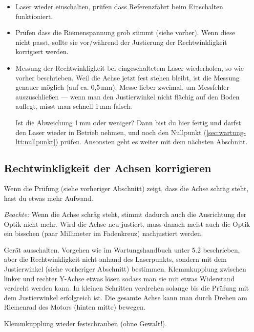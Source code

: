 \documentclass{\basedir/fablab-document}
\begin{document}
\begin{itemize}
		\item Laser wieder einschalten, prüfen dass Referenzfahrt beim Einschalten funktioniert.

		\item Prüfen dass die Riemenspannung grob stimmt (siehe vorher). Wenn diese nicht passt, sollte sie vor/während der Justierung der Rechtwinkligkeit korrigiert werden.

		\item Messung der Rechtwinkligkeit bei eingeschaltetem Laser wiederholen, so wie vorher beschrieben. Weil die Achse jetzt fest stehen bleibt, ist die Messung genauer möglich (auf ca. 0,5\,mm). Messe lieber zweimal, um Messfehler auszuschließen --- wenn man den Justierwinkel nicht flächig auf den Boden auflegt, misst man schnell 1\,mm falsch.

		Ist die Abweichung 1\,mm oder weniger? Dann bist du hier fertig und darfst den Laser wieder in Betrieb nehmen, und noch den Nullpunkt (\cref{sec:wartung-ltt:nullpunkt}) prüfen. Ansonsten geht es weiter mit dem nächsten Abschnitt.
	\end{itemize}
\subsection{Rechtwinkligkeit der Achsen korrigieren}
	Wenn die Prüfung (siehe vorheriger Abschnitt) zeigt, dass die Achse schräg steht, hast du etwas mehr Aufwand.

	\emph{Beachte:} Wenn die Achse schräg steht, stimmt dadurch auch die Ausrichtung der Optik nicht mehr. Wird die Achse neu justiert, muss danach meist auch die Optik ein bisschen (paar Millimeter im Fadenkreuz) nachjustiert werden.

	Gerät ausschalten. Vorgehen wie im Wartungshandbuch unter 5.2 beschrieben, aber die Rechtwinkligkeit nicht anhand des Laserpunkts, sondern mit dem Justierwinkel (siehe vorheriger Abschnitt) bestimmen. Klemmkupplung zwischen linker und rechter Y-Achse etwas lösen sodass man sie mit etwas Widerstand verdreht werden kann. In kleinen Schritten verdrehen solange bis die Prüfung mit dem Justierwinkel erfolgreich ist. Die gesamte Achse kann man durch Drehen am Riemenrad des Motors (hinten mitte) bewegen.

	Klemmkupplung wieder festschrauben (ohne Gewalt!).
\end{document}
